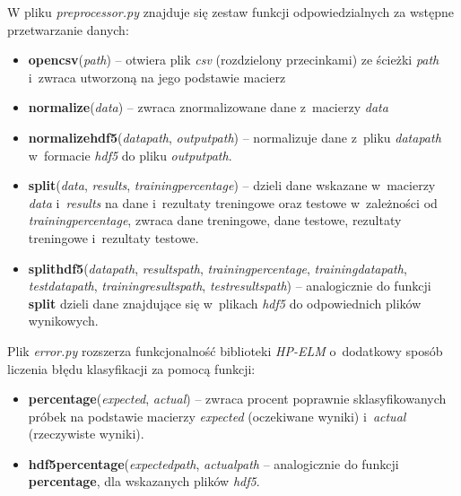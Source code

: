 \documentclass{article}
\begin{document}
W pliku \textit{preprocessor.py} znajduje się zestaw funkcji odpowiedzialnych za wstępne przetwarzanie danych:
\begin{itemize}
\item \textbf{open\textunderscore csv}(\textit{path}) -- otwiera plik \textit{csv} (rozdzielony przecinkami) ze ścieżki \textit{path} i~zwraca utworzoną na jego podstawie macierz
\item \textbf{normalize}(\textit{data}) -- zwraca znormalizowane dane z~macierzy \textit{data}
\item \textbf{normalize\textunderscore hdf5}(\textit{data\textunderscore path}, \textit{output\textunderscore path}) -- normalizuje dane z~pliku \textit{data\textunderscore path} w~formacie \textit{hdf5} do pliku \textit{output\textunderscore path}.
\item \textbf{split}(\textit{data}, \textit{results}, \textit{training\textunderscore percentage}) -- dzieli dane wskazane w~macierzy \textit{data} i~\textit{results} na dane i~rezultaty treningowe oraz testowe w~zależności od \textit{training\textunderscore percentage}, zwraca dane treningowe, dane testowe, rezultaty treningowe i~rezultaty testowe.
\item \textbf{split\textunderscore hdf5}(\textit{data\textunderscore path}, \textit{results\textunderscore path}, \textit{training\textunderscore percentage}, \textit{training\textunderscore data\textunderscore path}, \textit{test\textunderscore data\textunderscore path}, \textit{training\textunderscore results\textunderscore path}, \textit{test\textunderscore results\textunderscore path}) -- analogicznie do funkcji \textbf{split} dzieli dane znajdujące się w~plikach \textit{hdf5} do odpowiednich plików wynikowych.
\end{itemize}
Plik \textit{error.py} rozszerza funkcjonalność biblioteki \textit{HP-ELM} o~dodatkowy sposób liczenia błędu klasyfikacji za pomocą funkcji:
\begin{itemize}
\item \textbf{percentage}(\textit{expected}, \textit{actual}) -- zwraca procent poprawnie sklasyfikowanych próbek na podstawie macierzy \textit{expected} (oczekiwane wyniki) i~\textit{actual} (rzeczywiste wyniki).
\item \textbf{hdf5\textunderscore percentage}(\textit{expected\textunderscore path}, \textit{actual\textunderscore path} -- analogicznie do funkcji \textbf{percentage}, dla wskazanych plików \textit{hdf5}.
\end{itemize}
\end{document}
